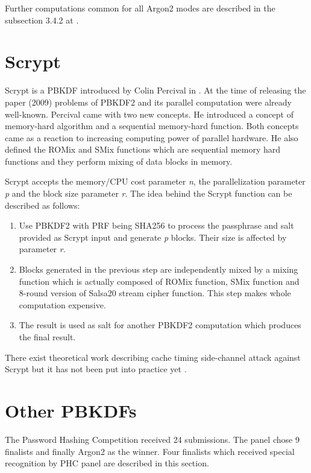 \documentclass[nolof,digital]{fithesis3}
\begin{document}
Further computations common for all Argon2 modes are described in the subsection 3.4.2 at \parencite{argon2draft}.

\section{Scrypt}
\label{sec:scrypt}
Scrypt is a PBKDF introduced by Colin Percival in \parencite{memoryhard}. At the time of releasing the paper (2009) problems of PBKDF2 and its parallel computation were already well-known. Percival came with two new concepts. He introduced a concept of memory-hard algorithm and a sequential memory-hard function. Both concepts came as a reaction to increasing computing power of parallel hardware. He also defined the ROMix and SMix functions which are sequential memory hard functions and they perform mixing of data blocks in memory.

Scrypt accepts the memory/CPU cost parameter \emph{n}, the parallelization parameter \emph{p} and the block size parameter \emph{r}. The idea behind the Scrypt function can be described as follows:

\begin{enumerate}
\item Use PBKDF2 with PRF being SHA256 to process the passphrase and salt provided as Scrypt input and generate \emph{p} blocks. Their size is affected by parameter \emph{r}.

\item Blocks generated in the previous step are independently mixed by a mixing function which is actually composed of ROMix function, SMix function and 8-round version of Salsa20 stream cipher function. This step makes whole computation expensive.

\item The result is used as salt for another PBKDF2 computation which produces the final result.
\end{enumerate}

There exist theoretical work describing cache timing side-channel attack against Scrypt but it has not been put into practice yet \parencite{scryptattack}.

\section{Other PBKDFs}
The Password Hashing Competition received 24 submissions. The panel chose 9 finalists and finally Argon2 as the winner. Four finalists which received special recognition by PHC panel are described in this section.
\end{document}
